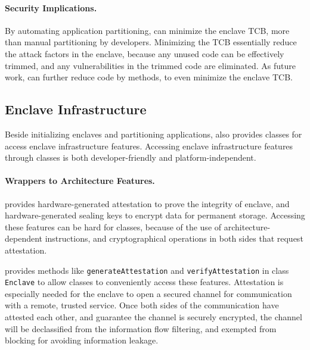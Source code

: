 \paragraph{Security Implications.}
By automating application partitioning,
\sysname{} can minimize the enclave TCB, more than
manual partitioning by developers.
Minimizing the TCB essentially reduce the attack factors in the enclave,
because any unused code can be effectively trimmed,
and any vulnerabilities in the trimmed code are eliminated.
As future work, \sysname{} can further reduce code by methods,
to even minimize the enclave TCB.


\subsection{Enclave Infrastructure}

Beside initializing enclaves and partitioning \java{} applications,
\sysname{} also provides classes for access enclave infrastructure features.
Accessing enclave infrastructure features through classes
is both developer-friendly and platform-independent.

\paragraph{Wrappers to Architecture Features.}
\intel{} \sgx{} provides hardware-generated attestation
to prove the integrity of enclave,
and hardware-generated sealing keys
to encrypt data for permanent storage.
Accessing these features can be hard for \java{} classes,
because of the use of architecture-dependent instructions,
and cryptographical operations in both sides that request attestation.

\sysname{} provides methods like {\tt generateAttestation}
and {\tt verifyAttestation} in class {\tt Enclave}
to allow \java{} classes to conveniently access these features.
Attestation is especially needed for the enclave to open
a secured channel for communication with a remote, trusted service.
Once both sides of the communication have attested each other,
and guarantee the channel is securely encrypted,
the channel will be declassified from the information flow filtering,
and exempted from blocking for avoiding information leakage.


